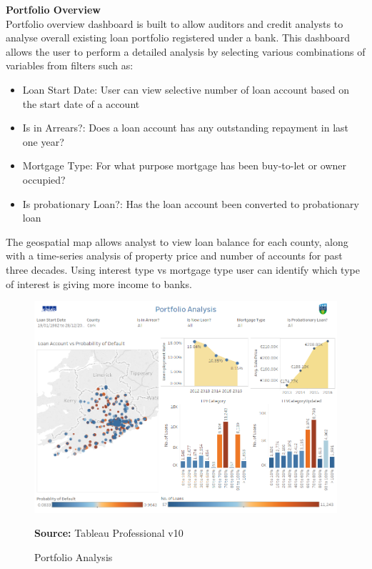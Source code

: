 \textbf{Portfolio Overview}\\
Portfolio overview dashboard is built to allow auditors and credit analysts to analyse overall existing loan portfolio registered under a bank. This dashboard allows the user to perform a detailed analysis by selecting various combinations of variables from filters such as:
\begin{itemize}
\item Loan Start Date: User can view selective number of loan account based on the start date of a account
\item Is in Arrears?: Does a loan account has any outstanding repayment in last one year?
\item Mortgage Type: For what purpose mortgage has been buy-to-let or owner occupied?
\item Is probationary Loan?: Has the loan account been converted to probationary loan
\end{itemize}

The geospatial map allows analyst to view loan balance for each county, along with a time-series analysis of property price and number of accounts for past three decades. Using interest type vs mortgage type user can identify which type of interest is giving more income to banks.

\begin{center}
\begin{figure}[!htb]
\includegraphics[width=\textwidth]{Analysis.png}
\centering
\caption{Portfolio Analysis}{\textbf{Source:} Tableau Professional v10}
\label{fig:overview}
\end{figure}
\end{center}

